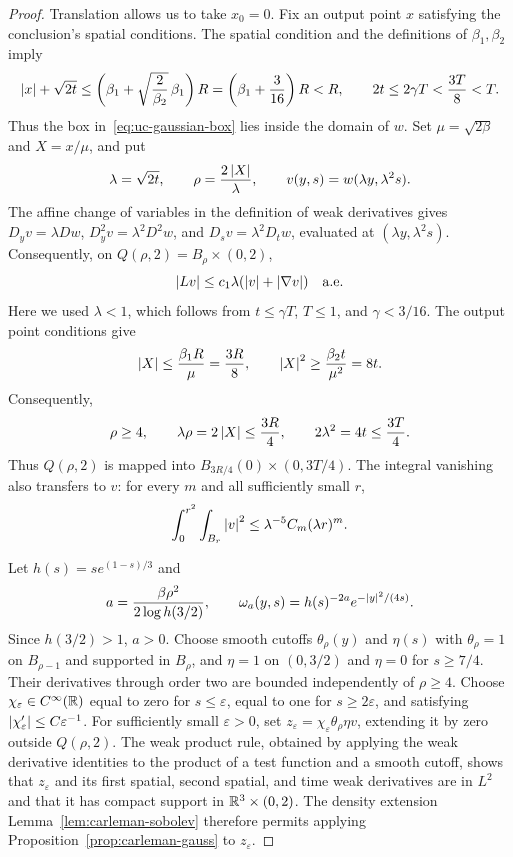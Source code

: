 \documentclass[11pt,letterpaper]{article}
\numberwithin{equation}{section}
\theoremstyle{plain}
\theoremstyle{definition}
\theoremstyle{remark}
\begin{document}
\begin{proof}
Translation allows us to take $x_0=0$. Fix an output point $x$ satisfying the
conclusion's spatial conditions. The spatial condition and the definitions of
$\beta_1,\beta_2$ imply
\[
 \left\lvert x\right\rvert+\sqrt{2t}
 \leq\left(\beta_1+\sqrt{\frac{2}{\beta_2}}\,\beta_1\right)R
 =\left(\beta_1+\frac{3}{16}\right)R<R,
 \qquad 2t\leq2\gamma T<\frac{3T}{8}<T.
\]
Thus the box in~\eqref{eq:uc-gaussian-box} lies inside the domain of $w$.
Set $\mu=\sqrt{2\beta}$ and $X=x/\mu$, and put
\[
 \lambda=\sqrt{2t},\qquad \rho=\frac{2\left\lvert X\right\rvert}{\lambda},\qquad
 v(y,s)=w(\lambda y,\lambda^2s).
\]
The affine change of variables in the definition of weak derivatives gives
$D_yv=\lambda Dw$, $D_y^2v=\lambda^2D^2w$, and
$D_sv=\lambda^2D_tw$, evaluated at $(\lambda y,\lambda^2s)$. Consequently,
on $Q(\rho,2)=B_\rho\times(0,2)$,
\[
 \left\lvert L v\right\rvert\leq c_1\lambda(\left\lvert v\right\rvert+\left\lvert \nabla v\right\rvert)\quad\text{a.e.}
\]
Here we used $\lambda<1$, which follows from $t\leq\gamma T$,
$T\leq1$, and $\gamma<3/16$. The output point conditions give
\[
 \left\lvert X\right\rvert\leq\frac{\beta_1R}{\mu}=\frac{3R}{8},\qquad
 \left\lvert X\right\rvert^2\geq\frac{\beta_2t}{\mu^2}=8t.
\]
Consequently,
\[
 \rho\geq4,\qquad \lambda\rho=2\left\lvert X\right\rvert\leq\frac{3R}{4},\qquad
 2\lambda^2=4t\leq\frac{3T}{4}.
\]
Thus $Q(\rho,2)$ is mapped into
$B_{3R/4}(0)\times(0,3T/4)$. The integral vanishing also transfers to $v$:
for every $m$ and all sufficiently small $r$,
\[
 \int_0^{r^2}\int_{B_r}\left\lvert v\right\rvert^2\leq
       \lambda^{-5}C_m(\lambda r)^m.
\]

Let $h(s)=s e^{(1-s)/3}$ and
\[
 a=\frac{\beta\rho^2}{2\log h(3/2)},\qquad
 \omega_a(y,s)=h(s)^{-2a}e^{-\left\lvert y\right\rvert^2/(4s)}.
\]
Since $h(3/2)>1$, $a>0$. Choose smooth cutoffs $\theta_\rho(y)$ and
$\eta(s)$ with $\theta_\rho=1$ on $B_{\rho-1}$ and supported in $B_\rho$,
and $\eta=1$ on $(0,3/2)$ and $\eta=0$ for $s\geq7/4$. Their derivatives
through order two are bounded independently of $\rho\geq4$. Choose
$\chi_\varepsilon\in C^\infty(\mathbb{R})$ equal to zero for $s\leq\varepsilon$,
equal to one for $s\geq2\varepsilon$, and satisfying
$\left\lvert \chi_\varepsilon'\right\rvert\leq C\varepsilon^{-1}$. For sufficiently small
$\varepsilon>0$, set
$z_\varepsilon=\chi_\varepsilon\theta_\rho\eta v$, extending it by zero
outside $Q(\rho,2)$. The weak product rule, obtained by applying the weak
derivative identities to the product of a test function and a smooth cutoff,
shows that $z_\varepsilon$ and its first spatial, second spatial, and time
weak derivatives are in $L^2$ and that it has compact support in
$\mathbb{R}^3\times(0,2)$. The density extension
Lemma~\ref{lem:carleman-sobolev} therefore permits applying
Proposition~\ref{prop:carleman-gauss} to $z_\varepsilon$.


\end{proof}
\end{document}
